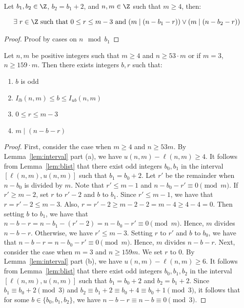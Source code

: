 \begin{lemma}[res b r]
    \label{lemma:res_b_r}
    \leanok

    Let $b_1,b_2\in\Z$, $b_2 = b_1 + 2$, and $n,m\in\Z$ such that $m \geq 4$, then:

    \[
        \exists\ r\in \Z\text{ such that } 0 \leq r \leq m - 3\text{ and } (m \mid (n - b_1 - r)) \lor (m \mid (n - b_2 - r))
    \]
\end{lemma}

\begin{proof}
    Proof by cases on $n \mod b_1$
\end{proof}

\begin{lemma}[b r]
    \label{lemma:b_r}
    \leanok
    Let $n,m$ be positive integers such that $m \geq 4$ and $n \geq 53\cdot m$ or if $m = 3$, $n \geq 159\cdot m$. Then there exists integers $b,r$ such that:

    \begin{enumerate}
        \item $b$ is odd
        \item $I_{lb}(n,m) \leq b \leq I_{ub}(n,m)$
        \item $0 \leq r \leq m - 3$
        \item $m \mid (n - b - r)$
    \end{enumerate}
\end{lemma}

\begin{proof}
    \leanok
    First, consider the case when $m \geq 4$ and $n \geq 53m$.
  By Lemma~\ref{lem:interval} part (a), we have $u(n,m) - \ell(n,m) \geq 4.$
  It follows from Lemma~\ref{lem:blist} that there exist odd integers
  $b_0, b_1$ in the interval $[\ell(n,m), u(n,m)]$ such that $b_1 = b_0+2$.
  Let $r'$ be the remainder when $n - b_0$ is divided by $m$.
  Note that $r' \leq m - 1$ and $n - b_0 - r' \equiv 0 \pmod{m}.$
  If $r' \geq m - 2$, set $r$ to $r'-2$ and $b$ to $b_1$.
  Since $r' \leq m-1$, we have that $r = r' - 2 \leq m - 3$.
  Also, $r = r'-2 \geq m-2-2 = m - 4 \geq 4 - 4 = 0$.
  Then setting $b$ to $b_1$, we have that
  $n - b - r = n - b_1 - (r'-2)
  = n - b_0 - r' \equiv 0 \pmod{m}$.
  Hence, $m$ divides $n - b - r$.
  Otherwise, we have $r' \leq m - 3$. Setting $r$ to $r'$ and $b$ to $b_0$,
  we have that $n - b - r = n - b_0 - r' \equiv 0 \pmod{m}.$
  Hence, $m$ divides $n - b - r$.
  Next, consider the case when $m = 3$ and $n \geq 159m$. We set $r$ to 0.
  By Lemma~\ref{lem:interval} part (b), we have $u(n,m) - \ell(n,m) \geq 6.$
  It follows from Lemma~\ref{lem:blist} that there exist odd integers $b_0,
  b_1, b_2$ in the interval $[\ell(n,m), u(n,m)]$ such that $b_1 = b_0+2$ and
  $b_2 = b_1 + 2$.
  Since $b_1 \equiv b_0 + 2 \pmod{3}$ and
  $b_2 \equiv b_1 + 2 \equiv b_0 + 4 \equiv b_0 + 1 \pmod{3}$, it follows that
  for some $b \in \{b_0, b_1,b_2\}$, we have
  $n - b - r \equiv n - b \equiv 0 \pmod{3}$.
\end{proof}


